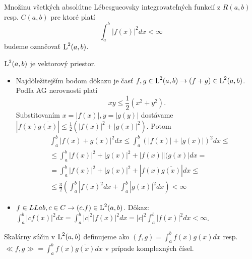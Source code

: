 \begin{definicia}

Množinu všetkých absolútne Lébesgueovsky integrovateľných funkcií z $R(a,b)$
resp. $C(a,b)$
pre ktoré platí
\begin{equation}
\int_a^b |f(x)|^2 dx < \infty
\end{equation}
budeme označovať $\mbox{L}^2(a,b)$.

\end{definicia}

\begin{lema}
$\mbox{L}^2(a,b)$ je vektorový priestor.
\end{lema}

\begin{dokaz}
\begin{itemize}
\item
Najdôležitejším bodom dôkazu je časť $f,g \in \mbox{L}^2(a,b) \rightarrow (f+g)\in \mbox{L}^2(a,b)$.
Podľa AG nerovnosti platí 
\begin{equation*}
    xy \le \frac{1}{2}(x^2 + y^2).
\end{equation*}
Substitovaním $x=|f(x)|,y=|g(y)|$ dostávame
$|f(x)\overline{g(x)}| \le \frac{1}{2} 
( |f(x)|^2 + |g(x)|^2) $.
 Potom
 \begin{eqnarray*}
    & \int_a^b |f(x)+g(x)|^2 dx  \le
    \int_a^b (|f(x)|+|g(x)|)^2 dx \le \\    
    & \le  \int_a^b |f(x)|^2 + |g(x)|^2 + |f(x)||(g(x)| dx = \\
    & = \int_a^b |f(x)|^2 + |g(x)|^2 + |f(x) \overline{g(x)}| dx \le \\
    & \le \frac{3}{2}( \int_a^b |f(x)^2 dx + \int_a^b |g(x)|^2 dx)
    < \infty
 \end{eqnarray*} 
\item
$f \in LLab, c\in C \rightarrow (c.f) \in \mbox{L}^2(a,b)$.
Dôkaz: $\int_a^b |cf(x)|^2 dx = \int_a^b |c|^2 |f(x)|^2 dx =
 |c|^2 \int_a^b |f(x)|^2 dx < \infty$.
\end{itemize}
\end{dokaz}

\begin{definicia}
 Skalárny súčin v $\mbox{L}^2(a,b)$ definujeme ako
  $(f,g) = \int_a^b f(x) g(x) dx$ resp. 
  $\ll f,g \gg = \int_a^b f(x) \overline{g(x)} dx$ v prípade
  komplexných čísel.
\end{definicia}

